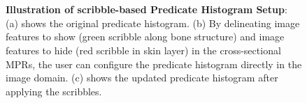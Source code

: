 \begin{figure}[ht]
	\centering
	 \\%
	 \\%
	\caption{
		\textbf{Illustration of scribble-based Predicate Histogram Setup}: \\
		(a) shows the original predicate histogram. 
		(b) By delineating image features to show (green scribble along bone structure) and image features to hide (red scribble in skin layer) in the cross-sectional MPRs, the user can configure the predicate histogram directly in the image domain. 
		(c) shows the updated predicate histogram after applying the scribbles.
	}
	\label{fig:predicates:scribble-fused}
\end{figure}
